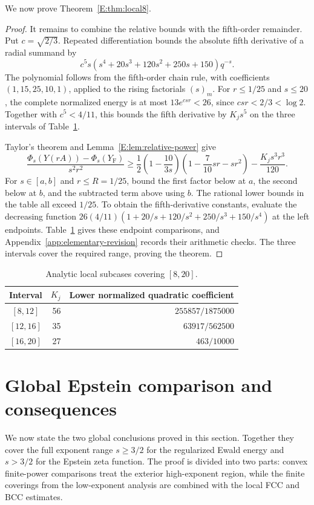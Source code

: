 \documentclass[reqno,english]{amsart}
\theoremstyle{definition}
\newtheorem{open problem}[theorem]{Open Problem}
\theoremstyle{remark}
\theoremstyle{plain}
\numberwithin{equation}{section}
\newcommand{\YF}{Y_{\mathrm F}}
\begin{document}
We now prove Theorem~\ref{E:thm:local8}.

\begin{proof}
It remains to combine the relative bounds with the fifth-order
remainder. Put $c=\sqrt{2/3}$. Repeated differentiation bounds
the absolute fifth derivative of a radial summand by
\[
 c^5s(s^4+20s^3+120s^2+250s+150)q^{-s}.
\]
The polynomial follows from the fifth-order chain rule, with
coefficients $(1,15,25,10,1)$, applied to the rising factorials
$(s)_m$. For $r\le1/25$ and $s\le20$, the complete normalized
energy is at most $13e^{csr}<26$, since $csr<2/3<\log2$.
Together with $c^5<4/11$, this bounds the fifth derivative by
$K_js^5$ on the three intervals of Table~\ref{E:tab:local8}.

Taylor's theorem and Lemma~\ref{E:lem:relative-power} give
\[
 \frac{\Phi_s(Y(rA))-\Phi_s(\YF)}{s^2r^2}
 \ge\frac12\left(1-\frac{10}{3s}\right)
 \left(1-\frac7{10}sr-sr^2\right)-\frac{K_js^3r^3}{120}.
\]
For $s\in[a,b]$ and $r\le R=1/25$, bound the first factor
below at $a$, the second below at $b$, and the subtracted term
above using $b$. The rational lower bounds in the table all exceed
$1/25$. To obtain the fifth-derivative constants, evaluate the
decreasing function
$26(4/11)(1+20/s+120/s^2+250/s^3+150/s^4)$ at the left endpoints.
Table~\ref{E:tab:local8} gives these endpoint comparisons, and
Appendix~\ref{app:elementary-revision} records their arithmetic
checks. The three intervals cover the required range, proving the
theorem.
\end{proof}


\begin{table}[ht]\centering
\caption{Analytic local subcases covering $[8,20]$.}\label{E:tab:local8}
\begin{tabular}{crr}\toprule
Interval&$K_j$&Lower normalized quadratic coefficient\\\midrule
$[8,12]$&56&$255857/1875000$\\
$[12,16]$&35&$63917/562500$\\
$[16,20]$&27&$463/10000$\\\bottomrule
\end{tabular}
\end{table}

\section{Global Epstein comparison and consequences}\label{sec:epstein-global}

We now state the two global conclusions proved in this section. Together they cover the full exponent range $s\ge3/2$ for the regularized Ewald energy and $s>3/2$ for the Epstein zeta function. The proof is divided into two parts: convex finite-power comparisons treat the exterior high-exponent region, while the finite coverings from the low-exponent analysis are combined with the local FCC and BCC estimates.
\end{document}
